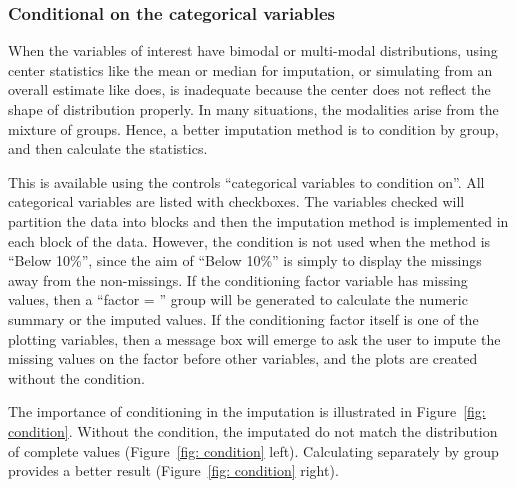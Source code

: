 \documentclass[article]{jss}
\begin{document}
\subsubsection{Conditional on the categorical variables}

When the variables of interest have bimodal or multi-modal distributions,
using center statistics like the mean or median for imputation,
or simulating from an overall estimate like  does, is
inadequate because the center does not reflect the shape of
distribution properly. In many situations, the modalities arise
from the mixture of groups. Hence, a better imputation method is
to condition by group, and then calculate the statistics.

This is available using the controls ``categorical variables to
condition on''. All categorical variables are listed with checkboxes.
The variables checked will partition the data into blocks and
then the imputation method is implemented in each block of the
data. However, the condition is not used when the method is
``Below 10\%'', since the aim of ``Below 10\%'' is simply to
display the missings away from the non-missings. If the conditioning
factor variable has missing values, then a ``factor = ''
group will be generated to calculate the numeric summary or the
imputed values. If the conditioning factor itself is one of the
plotting variables, then a message box will emerge to ask the user
to impute the missing values on the factor before other variables,
and the plots are created without the condition.

The importance of conditioning in the imputation is illustrated
in Figure~\ref{fig: condition}. Without the condition, the imputated
do not match the distribution of complete values
(Figure~\ref{fig: condition} left). Calculating separately by group
provides a better result (Figure~\ref{fig: condition} right).
\end{document}
